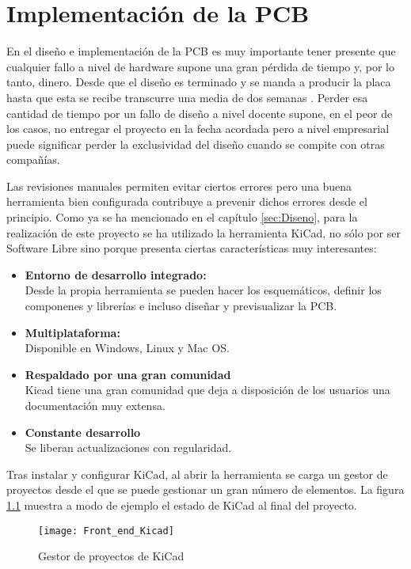 \chapter{Implementación de la PCB\label{sec:Implementacion_PCB}}

En el diseño e implementación de la \acrshort{PCB} es muy importante tener presente que cualquier fallo a nivel de hardware supone una gran pérdida de tiempo y, por lo tanto, dinero. Desde que el diseño es terminado y se manda a producir la placa hasta que esta se recibe transcurre una media de dos semanas . Perder esa cantidad de tiempo por un fallo de diseño a nivel docente supone, en el peor de los casos, no entregar el proyecto en la fecha acordada pero a nivel empresarial puede significar perder la exclusividad del diseño cuando se compite con otras compañías. 

Las revisiones manuales permiten evitar ciertos errores pero una buena herramienta bien configurada contribuye a prevenir dichos errores desde el principio. Como ya se ha mencionado en el capítulo \ref{sec:Diseno}, para la realización de este proyecto se ha utilizado la herramienta KiCad, no sólo por ser Software Libre sino porque presenta ciertas características muy interesantes:
\begin{itemize}
\item \textbf{Entorno de desarrollo integrado:}
\\Desde la propia herramienta se pueden hacer los esquemáticos, definir los componenes y librerías e incluso diseñar y previsualizar la \acrshort{PCB}.
\item \textbf{Multiplataforma:}
\\Disponible en Windows, Linux y Mac OS.
\item \textbf{Respaldado por una gran comunidad} 
\\Kicad tiene una gran comunidad que deja a disposición de los usuarios una documentación muy extensa.
\item \textbf{Constante desarrollo}
\\Se liberan actualizaciones con regularidad.
\end{itemize}

Tras instalar y configurar KiCad, al abrir la herramienta se carga un gestor de proyectos desde el que se puede gestionar un gran número de elementos. La figura \ref{fig:Front_end_Kicad} muestra a modo de ejemplo el estado de KiCad al final del proyecto.

\begin{figure} [h]
    \centering
    \texttt{[image: Front\_end\_Kicad]}
    \caption{Gestor de proyectos de KiCad}
    \label{fig:Front_end_Kicad}
\end{figure}

